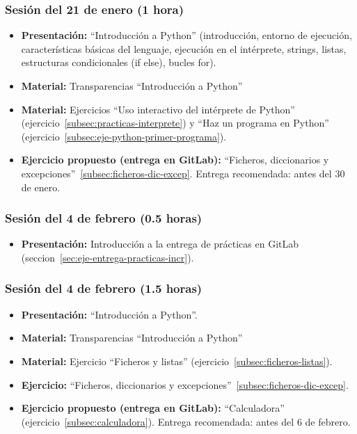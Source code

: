 \documentclass[a4paper,12pt]{article}
\begin{document}
\subsubsection{Sesión del 21 de enero (1 hora)}

\begin{itemize}
\item \textbf{Presentación:} ``Introducción a Python'' (introducción, entorno de ejecución, características básicas del lenguaje, ejecución en el intérprete, strings, listas, estructuras condicionales (if else), bucles for).
\item \textbf{Material:} Transparencias ``Introducción a Python''
\item \textbf{Material:} Ejercicios ``Uso interactivo del intérprete de Python'' (ejercicio~\ref{subsec:practicas-interprete}) y ``Haz un programa en Python'' (ejercicio~\ref{subsec:eje-python-primer-programa}).
\item \textbf{Ejercicio propuesto (entrega en GitLab):} ``Ficheros, diccionarios y excepciones''~\ref{subsec:ficheros-dic-excep}.
   Entrega recomendada: antes del 30 de enero.
\end{itemize}

\subsubsection{Sesión del 4 de febrero (0.5 horas)}

\begin{itemize}
\item \textbf{Presentación:} Introducción a la entrega de prácticas en GitLab (seccion~\ref{sec:eje-entrega-practicas-incr}).
\end{itemize}

\subsubsection{Sesión del 4 de febrero (1.5 horas)}

\begin{itemize}
\item \textbf{Presentación:} ``Introducción a Python''.
\item \textbf{Material:} Transparencias ``Introducción a Python''
\item \textbf{Material:} Ejercicio ``Ficheros y listas'' (ejercicio~\ref{subsec:ficheros-listas}).
\item \textbf{Ejercicio:} ``Ficheros, diccionarios y excepciones''~\ref{subsec:ficheros-dic-excep}.
\item \textbf{Ejercicio propuesto (entrega en GitLab):} ``Calculadora'' (ejercicio~\ref{subsec:calculadora}).
   Entrega recomendada: antes del 6 de febrero.
\end{itemize}
\end{document}
